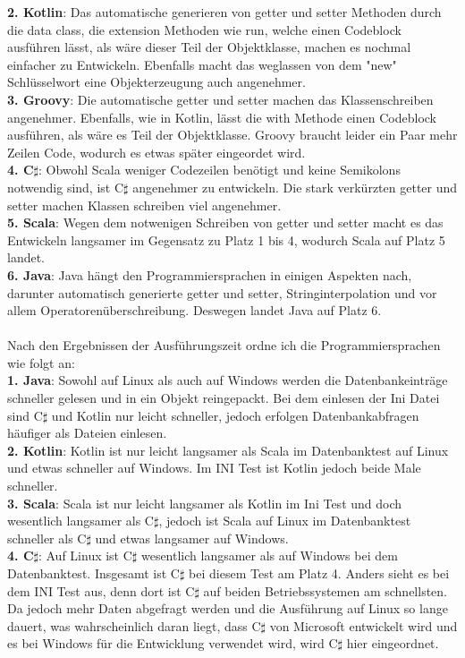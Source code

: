\documentclass[ngerman]{article}
\begin{document}
    \textbf{2. Kotlin}: Das automatische generieren von getter und setter Methoden durch die data class, die extension Methoden wie run, welche einen Codeblock ausführen lässt, als wäre dieser Teil der Objektklasse, machen es nochmal einfacher zu Entwickeln. Ebenfalls macht das weglassen von dem "new" Schlüsselwort eine Objekterzeugung auch angenehmer.\\
    \textbf{3. Groovy}: Die automatische getter und setter machen das Klassenschreiben angenehmer. Ebenfalls, wie in Kotlin, lässt die with Methode einen Codeblock ausführen, als wäre es Teil der Objektklasse. Groovy braucht leider ein Paar mehr Zeilen Code, wodurch es etwas später eingeordet wird.\\
    \textbf{4. C$\sharp$}: Obwohl Scala weniger Codezeilen benötigt und keine Semikolons notwendig sind, ist C$\sharp$ angenehmer zu entwickeln. Die stark verkürzten getter und setter machen Klassen schreiben viel angenehmer.\\
    \textbf{5. Scala}: Wegen dem notwenigen Schreiben von getter und setter macht es das Entwickeln langsamer im Gegensatz zu Platz 1 bis 4, wodurch Scala auf Platz 5 landet.\\
    \textbf{6. Java}: Java hängt den Programmiersprachen in einigen Aspekten nach, darunter automatisch generierte getter und setter, Stringinterpolation und vor allem Operatorenüberschreibung. Deswegen landet Java auf Platz 6.\\\\
    Nach den Ergebnissen der Ausführungszeit ordne ich die Programmiersprachen wie folgt an:\\
    \textbf{1. Java}: Sowohl auf Linux als auch auf Windows werden die Datenbankeinträge schneller gelesen und in ein Objekt reingepackt. Bei dem einlesen der Ini Datei sind C$\sharp$ und Kotlin nur leicht schneller, jedoch erfolgen Datenbankabfragen häufiger als Dateien einlesen.\\
    \textbf{2. Kotlin}: Kotlin ist nur leicht langsamer als Scala im Datenbanktest auf Linux und etwas schneller auf Windows. Im INI Test ist Kotlin jedoch beide Male schneller.\\
    \textbf{3. Scala}: Scala ist nur leicht langsamer als Kotlin im Ini Test und doch wesentlich langsamer als C$\sharp$, jedoch ist Scala auf Linux im Datenbanktest schneller als C$\sharp$ und etwas langsamer auf Windows.\\
    \textbf{4. C$\sharp$}: Auf Linux ist C$\sharp$ wesentlich langsamer als auf Windows bei dem Datenbanktest. Insgesamt ist C$\sharp$ bei diesem Test am Platz 4. Anders sieht es bei dem INI Test aus, denn dort ist C$\sharp$ auf beiden Betriebssystemen am schnellsten. Da jedoch mehr Daten abgefragt werden und die Ausführung auf Linux so lange dauert, was wahrscheinlich daran liegt, dass C$\sharp$ von Microsoft entwickelt wird und es bei Windows für die Entwicklung verwendet wird, wird C$\sharp$ hier eingeordnet.\\
\end{document}
